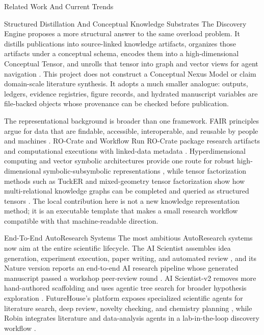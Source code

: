 \documentclass[
  ignorenonframetext,
]{beamer}
\begin{document}
\begin{frame}{Related Work And Current Trends}
\begin{block}{Structured Distillation And Conceptual Knowledge
Substrates}
\protect{}\label{sec:structured-distillation-knowledge-substrates}
The Discovery Engine proposes a more structural answer to the same
overload problem. It distills publications into source-linked knowledge
artifacts, organizes those artifacts under a conceptual schema, encodes
them into a high-dimensional Conceptual Tensor, and unrolls that tensor
into graph and vector views for agent navigation
. This project does not construct
a Conceptual Nexus Model or claim domain-scale literature synthesis. It
adopts a much smaller analogue: outputs, ledgers, evidence registries,
figure records, and hydrated manuscript variables are file-backed
objects whose provenance can be checked before publication.

The representational background is broader than one framework. FAIR
principles argue for data that are findable, accessible, interoperable,
and reusable by people and machines . RO-Crate
and Workflow Run RO-Crate package research artifacts and computational
executions with linked-data metadata . Hyperdimensional computing
and vector symbolic architectures provide one route for robust
high-dimensional symbolic-subsymbolic representations
, while tensor factorization methods such as
TuckER and mixed-geometry tensor factorization show how multi-relational
knowledge graphs can be completed and queried as structured tensors
. The
local contribution here is not a new knowledge representation method; it
is an executable template that makes a small research workflow
compatible with that machine-readable direction.
\end{block}

\begin{block}{End-To-End AutoResearch Systems}
\protect{}\label{sec:end-to-end-autoresearch-systems}
The most ambitious AutoResearch systems now aim at the entire scientific
lifecycle. The AI Scientist assembles idea generation, experiment
execution, paper writing, and automated review
\breakseq{[@lu\_aiscientist\_2024]}, and its Nature version reports an
end-to-end AI research pipeline whose generated manuscript passed a
workshop peer-review round . AI
Scientist-v2 removes more hand-authored scaffolding and uses agentic
tree search for broader hypothesis exploration
. FutureHouse's platform exposes
specialized scientific agents for literature search, deep review,
novelty checking, and chemistry planning
, while Robin integrates literature
and data-analysis agents in a lab-in-the-loop discovery workflow
.


\end{block}
\end{frame}
\end{document}
